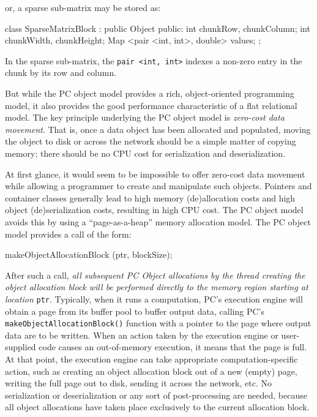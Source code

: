 or, a sparse sub-matrix may be stored as:

\begin{codesmall}
class SparseMatrixBlock : public Object {
public:
	int chunkRow, chunkColumn;
	int chunkWidth, chunkHeight;
	Map <pair <int, int>, double> values; 
};
\end{codesmall}

In the sparse sub-matrix, the \texttt{pair <int, int>} indexes a non-zero entry in the chunk by its row and column.

But while the PC object model provides a rich, object-oriented programming model, it also provides the good performance characteristic
of a flat relational model.
The key principle underlying the PC object model is \emph{zero-cost data movement}.  That is, once a data object
has been allocated and populated, moving the object to disk or across
the network should be a simple matter of copying memory; there
should be no CPU cost for serialization and deserialization.

At first glance, it would seem to be impossible to offer zero-cost data movement while allowing a programmer to create and manipulate such objects.  
Pointers and container classes 
generally lead to high memory (de)allocation costs and high object (de)serialization costs, resulting in high CPU cost.
The PC object model avoids this 
by using a ``page-as-a-heap'' memory allocation model.  
The PC object model provides a call of the form:

\begin{codesmall}
makeObjectAllocationBlock (ptr, blockSize);
\end{codesmall}

After such a call, \emph{all subsequent PC Object allocations by the thread creating the object allocation block will be performed directly to the memory
region starting at location} \texttt{ptr}.
Typically, when it runs a computation, PC's execution engine will obtain a page from its buffer pool to buffer output data, calling
PC's
\texttt{makeObjectAllocationBlock()} function with a pointer to the page where output data are to be written.  
When an action taken by the execution engine or user-supplied code causes an
out-of-memory execution, it means that the page is full.  At that point, the execution engine can take appropriate computation-specific 
action, such as creating 
an object allocation block out of a new (empty) page, writing the full page out to disk, sending it across the network, etc.  
No serialization or deserialization or any sort of post-processing are needed, 
because all object allocations have taken place exclusively to the current allocation block.  


